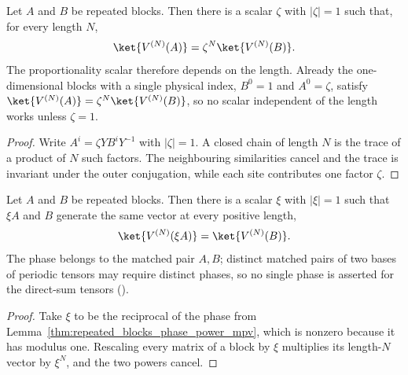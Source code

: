 \begin{lemma}
    \label{thm:repeated_blocks_phase_power_mpv}
    \leanok
    Let $A$ and $B$ be repeated blocks.  Then there is a scalar $\zeta$ with
    $|\zeta|=1$ such that, for every length $N$,
    \begin{align}
        \ket{V^{(N)}(A)}=\zeta^{N}\ket{V^{(N)}(B)}.
        \notag
    \end{align}
    The proportionality scalar therefore depends on the length.  Already the
    one-dimensional blocks with a single physical index, $B^0=1$ and
    $A^0=\zeta$, satisfy $\ket{V^{(N)}(A)}=\zeta^{N}\ket{V^{(N)}(B)}$, so no
    scalar independent of the length works unless $\zeta=1$.
\end{lemma}
\begin{proof}
    \leanok
    Write $A^i=\zeta YB^iY^{-1}$ with $|\zeta|=1$.  A closed chain of length
    $N$ is the trace of a product of $N$ such factors.  The neighbouring
    similarities cancel and the trace is invariant under the outer
    conjugation, while each site contributes one factor $\zeta$.
\end{proof}

\begin{lemma}
    \label{thm:repeated_blocks_phase_absorption}
    \leanok
    Let $A$ and $B$ be repeated blocks.  Then there is a scalar $\xi$ with
    $|\xi|=1$ such that $\xi A$ and $B$ generate the same vector at every
    positive length,
    \begin{align}
        \ket{V^{(N)}(\xi A)}=\ket{V^{(N)}(B)}.
        \notag
    \end{align}
    The phase belongs to the matched pair $A,B$; distinct matched pairs of two
    bases of periodic tensors may require distinct phases, so no single phase
    is asserted for the direct-sum tensors
    (\cite[lines~286--305, 625--627]{DeLasCuevas2017Irreducible}).
\end{lemma}
\begin{proof}
    \leanok
    Take $\xi$ to be the reciprocal of the phase from
    Lemma~\ref{thm:repeated_blocks_phase_power_mpv}, which
    is nonzero because it has modulus one.  Rescaling every matrix of a block
    by $\xi$ multiplies its length-$N$ vector by $\xi^{N}$, and the two powers
    cancel.
\end{proof}

